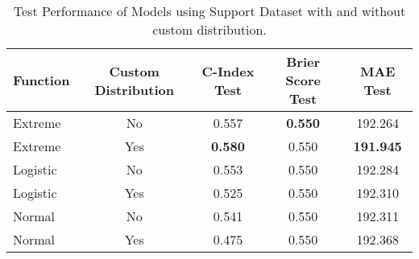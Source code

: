 \begin{table}[h!]
\centering
\caption{Test Performance of Models using Support Dataset with and without custom distribution.}
\label{tab:test_performance_support_1}
\begin{tabular}{l|c|c|c|c}
\hline
\textbf{Function} & \textbf{Custom Distribution} & \textbf{C-Index Test} & \textbf{Brier Score Test} & \textbf{MAE Test} \\
\hline
Extreme & No & 0.557 & \textbf{0.550} & 192.264 \\
Extreme & Yes & \textbf{0.580} & 0.550 & \textbf{191.945} \\
Logistic & No & 0.553 & 0.550 & 192.284 \\
Logistic & Yes & 0.525 & 0.550 & 192.310 \\
Normal & No & 0.541 & 0.550 & 192.311 \\
Normal & Yes & 0.475 & 0.550 & 192.368 \\
\hline
\end{tabular}
\end{table}
